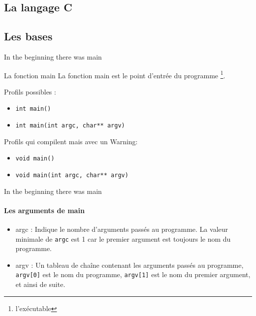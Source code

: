 \documentclass{beamer}
\begin{document}
  \begin{darkframes}
  	
	
	
  	\section{La langage C}
  	\subsection{Les bases}
  	\begin{frame}{In the beginning there was main}
  		\begin{block}{La fonction main}
  			La fonction \alert{main} est le point d'entrée du programme \footnote[frame]{l'exécutable}.
  		\end{block}
  		\begin{exampleblock}{Profils possibles :}
  			\begin{itemize}
  				\item \texttt{int main()}
  				\item \texttt{int main(int argc, char** argv)}
  			\end{itemize}
  		\end{exampleblock}
  		\begin{alertblock}{Profils qui compilent mais avec un Warning:}
  			\begin{itemize}
	  			\item \texttt{void main()}
	  			\item \texttt{void main(int argc, char** argv)}
  			\end{itemize}
  		\end{alertblock}
  	\end{frame}
  
  	\begin{frame}{In the beginning there was main}
		\framesubtitle{Les arguments de main}
		\begin{itemize}
			\item \alert{argc} : Indique le nombre d'arguments passés au programme. La valeur minimale de \texttt{argc} est 1 car le premier argument est toujours le nom du programme.
			\item \alert{argv} : Un tableau de chaîne contenant les arguments passés au programme, \texttt{argv[0]} est le nom du programme, \texttt{argv[1]} est le nom du premier argument, et ainsi de suite.
		\end{itemize}
  	\end{frame}
  

\end{darkframes}
\end{document}
